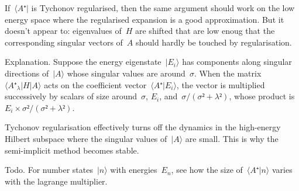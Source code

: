 If~$〈A⁺|$ is Tychonov regularised, then the same argument should work on the low energy space where the regularised expansion is a good approximation.  But it doesn't appear to: eigenvalues of~$H$ are shifted that are low enoug that the corresponding singular vectors of~$A$ should hardly be touched by regularisation.

Explanation.  Suppose the energy eigenstate~$|E_i〉$ has components along singular directions of~$|A〉$ whose singular values are around~$σ$.  When the matrix~$〈A⁺_λ|H|A〉$ acts on the coefficient vector~$〈A⁺|E_i〉$, the vector is multiplied successively by scalars of size around~$σ$, $E_i$, and~$σ/(σ²+λ²)$, whose product is~$E_i×σ²/(σ²+λ²)$.

Tychonov regularisation effectively turns off the dynamics in the high-energy Hilbert subspace where the singular values of~$|A〉$ are small.  This is why the semi-implicit method becomes stable.

Todo.  For number states~$|n〉$ with energies~$E_n$, see how the size of~$〈A⁺|n〉$ varies with the lagrange multiplier.

\bye